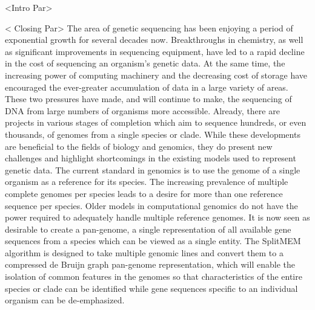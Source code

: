 \documentclass{paper}
\begin{document}
<Intro Par>
\newline\newline


< Closing Par>
The area of genetic sequencing has been enjoying a period of exponential growth for several decades now. Breakthroughs in chemistry, as well as significant improvements in sequencing equipment, have led to a rapid decline in the cost of sequencing an organism's genetic data. At the same time, the increasing power of computing machinery and the decreasing cost of storage have encouraged the ever-greater accumulation of data in a large variety of areas. These two pressures have made, and will continue to make, the sequencing of DNA from large numbers of organisms more accessible. Already, there are projects in various stages of completion which aim to sequence hundreds, or even thousands, of genomes from a single species or clade. While these developments are beneficial to the fields of biology and genomics, they do present new challenges and highlight shortcomings in the existing models used to represent genetic data. The current standard in genomics is to use the genome of a single organism as a reference for its species. The increasing prevalence of multiple complete genomes per species leads to a desire for more than one reference sequence per species. Older models in computational genomics do not have the power required to adequately handle multiple reference genomes. It is now seen as desirable to create a pan-genome, a single representation of all available gene sequences from a species which can be viewed as a single entity. The SplitMEM algorithm is designed to take multiple genomic lines and convert them to a compressed de Bruijn graph pan-genome representation, which will enable the isolation of common features in the genomes so that characteristics of the entire species or clade can be identified while gene sequences specific to an individual organism can be de-emphasized.
\newline\newline

 
\end{document}
